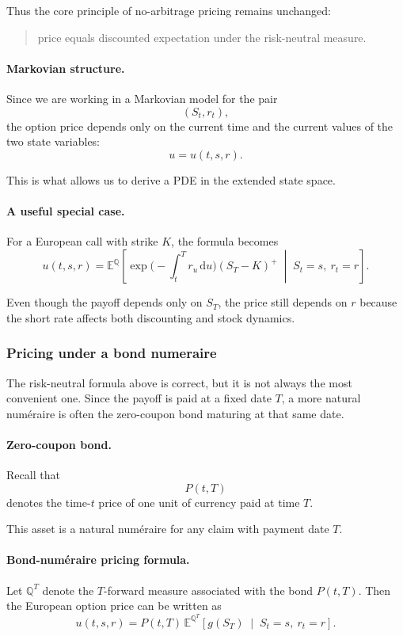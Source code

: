 \documentclass[11pt]{article}
\newcommand{\Qbb}{\mathbb{Q}}
\newcommand{\E}{\mathbb{E}}
\theoremstyle{plain}
\theoremstyle{definition}
\theoremstyle{remark}
\begin{document}
Thus the core principle of no-arbitrage pricing remains unchanged:
\begin{quote}
price equals discounted expectation under the risk-neutral measure.
\end{quote}

\paragraph{Markovian structure.}
Since we are working in a Markovian model for the pair
\[
(S_t,r_t),
\]
the option price depends only on the current time and the current values
of the two state variables:
\[
u=u(t,s,r).
\]

This is what allows us to derive a PDE in the extended state space.

\paragraph{A useful special case.}
For a European call with strike \(K\), the formula becomes
\[
\boxed{
u(t,s,r)
=
\E^\Qbb\!\left[
\exp\!\Big(-\int_t^T r_u\,\mathrm{d}u\Big)(S_T-K)^+
\;\middle|\;
S_t=s,\ r_t=r
\right].
}
\]

Even though the payoff depends only on \(S_T\), the price still depends
on \(r\) because the short rate affects both discounting and stock
dynamics.

\subsubsection{Pricing under a bond numeraire}

The risk-neutral formula above is correct, but it is not always the most
convenient one.
Since the payoff is paid at a fixed date \(T\), a more natural numéraire
is often the zero-coupon bond maturing at that same date.

\paragraph{Zero-coupon bond.}
Recall that
\[
P(t,T)
\]
denotes the time-\(t\) price of one unit of currency paid at time \(T\).

This asset is a natural numéraire for any claim with payment date \(T\).

\paragraph{Bond-numéraire pricing formula.}
Let \(\Qbb^T\) denote the \(T\)-forward measure associated with the bond
\(P(t,T)\).
Then the European option price can be written as
\[
\boxed{
u(t,s,r)
=
P(t,T)\,
\E^{\Qbb^T}\!\left[
g(S_T)
\;\middle|\;
S_t=s,\ r_t=r
\right].
}
\]
\end{document}
